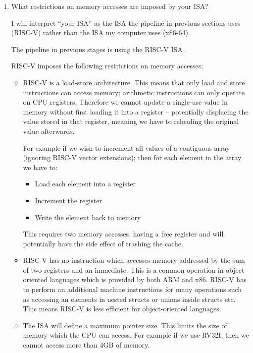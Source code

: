 \documentclass[10pt,\jkfside,a4paper]{article}
\begin{document}
\begin{enumerate}
\begin{itemize}
\end{itemize}

\item What restrictions on memory accesses are imposed by your ISA?

I will interpret ``your ISA'' as the ISA the pipeline in previous sections
uses (RISC-V) rather than the ISA my computer uses (x86-64).

The pipeline in previous stages is using the RISC-V ISA .

RISC-V imposes the following restrictions on memory accesses:

\begin{itemize}

\item RISC-V is a load-store architecture. This means that only load and
store instructions can access memory; arithmetic instructions can only operate
on CPU registers. Therefore we cannot update a single-use value in memory
without first loading it into a register -- potentially displacing the
value stored in that register, meaning we have to reloading the original value
afterwards.

For example if we wish to increment all values of a contiguous array
(ignoring RISC-V vector extensions); then for each element in the array we
have to:

\begin{itemize}

\item Load each element into a register

\item Increment the register

\item Write the element back to memory

\end{itemize}

This requires two memory accesses, having a free register and will
potentially have the side effect of trashing the cache.

\item RISC-V has no instruction which accesses memory addressed by the sum
of two registers and an immediate. This is a common operation in
object-oriented languages which is provided by both ARM and x86. RISC-V has
to perform an additional machine instructions for many operations such
as accessing an elements in nested structs or unions inside structs etc. This
means RISC-V is less efficient for object-oriented languages.

\item The ISA will define a maximum pointer size. This limits the size of
memory which the CPU can access. For example if we use RV32I, then we
cannot access more than 4GB of memory.


\end{itemize}
\end{enumerate}
\end{document}
